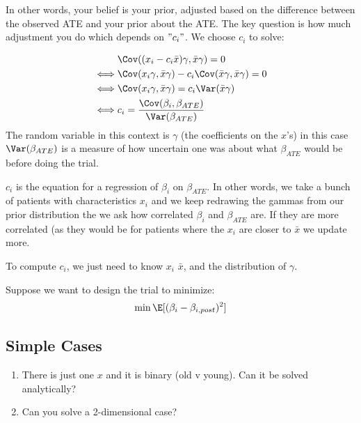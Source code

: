 \begin{enumerate}
\begin{enumerate}
				In other words, your belief is your prior, adjusted based on the difference between the observed ATE and your prior about the ATE.
				The key question is how much adjustment you do which depends on $"c_i"$. We choose $c_i$ to solve:

				\begin{align*}
                          & \Cov ((x_i - c_i \bar{x}) \gamma, \bar{x} \gamma) = 0                          \\
				 \iff     & \Cov(x_i \gamma, \bar{x} \gamma) -c_i \Cov(\bar{x} \gamma, \bar{x} \gamma) = 0 \\
					\iff  & \Cov(x_i \gamma, \bar{x} \gamma) = c_i \Var(\bar{x} \gamma)                  \\
				\iff & c_i = \frac{\Cov(\beta_i, \beta_{ATE}) }{ \Var(\beta_{ATE})}
				\end{align*} 
				The random variable in this context is $\gamma$ (the coefficients on the $x $'s) in this case $\Var(\beta_{ATE})$ is a measure of how uncertain one was about what $\beta_{ATE}$ would be before doing the trial.

				$c_i$ is the equation for a regression of $\beta_i$ on $\beta_{ATE}$. In other words, we take a bunch of patients with characteristics $x_i$ and we keep redrawing the gammas from our prior distribution the we ask how correlated  $\beta_i$ and $\beta_{ATE}$ are. If they are more correlated (as they would be for patients where the $x_i$ are closer to $\bar{x}$ we update more.

				To compute $c_i$, we just need to know $x_i$ $\bar{x}$, and the distribution of $\gamma$.

				Suppose we want to design the trial to minimize:
				\begin{align*}
					\min \E[(\beta_i - \beta_{i,post})^2]
				\end{align*} 
		\end{enumerate}

\end{enumerate} 

\subsection*{Simple Cases}
\begin{enumerate}
	\item There is just one $x$ and it is binary (old v young). Can it be solved analytically?
	\item Can you solve a 2-dimensional case? 
\end{enumerate}


